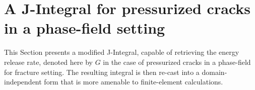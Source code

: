 \section{A J-Integral for pressurized cracks in a phase-field setting}\label{sec:j_integral}



This Section presents a modified J-Integral, capable of retrieving the energy release rate, denoted here by $G$ in the case of pressurized cracks in a phase-field for fracture setting. The resulting integral is then re-cast into a domain-independent form that is more amenable to finite-element calculations.  
 




